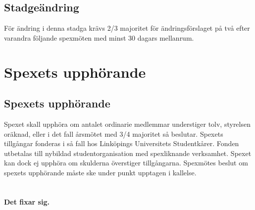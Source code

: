 \documentclass[a4paper]{article}
\begin{document}
\subsection{Stadgeändring}
För ändring i denna stadga krävs 2/3 majoritet för ändringsförslaget på två efter varandra följande spexmöten med minst 30 dagars mellanrum.

\section{Spexets upphörande}
\subsection{Spexets upphörande}
Spexet skall upphöra om antalet ordinarie medlemmar understiger tolv, styrelsen oräknad, eller i det fall årsmötet med 3/4 majoritet så beslutar. Spexets tillgångar fonderas i så fall hos Linköpings Universitets Studentkårer. Fonden utbetalas till nybildad studentorganisation med spexliknande verksamhet. Spexet kan dock ej upphöra om skulderna överstiger tillgångarna. Spexmötes beslut om spexets upphörande måste ske under punkt upptagen i kallelse.

\setcounter{section}{16}
\section{ }
\textbf{Det fixar sig.}
\end{document}
